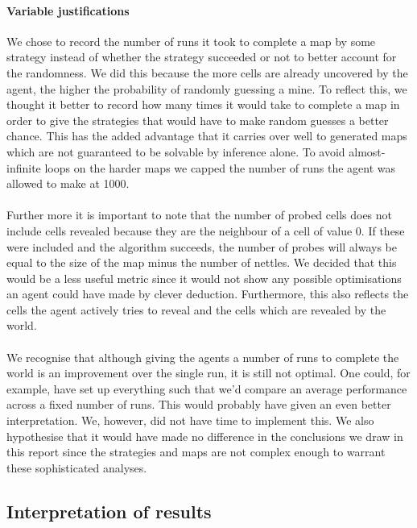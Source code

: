 \documentclass[british]{article}
\begin{document}
\paragraph{Variable justifications}We chose to record the number of runs it took to complete a map by some strategy instead of whether the strategy succeeded or not to better account  for the randomness. We did this because the more cells are already uncovered by the agent, the higher the probability of randomly guessing a mine. To reflect this, we thought it better to record how many times it would take to complete a map in order to give the strategies that would have to make random guesses a better chance. This has the added advantage that it carries over well to generated maps which are not guaranteed to be solvable by inference alone. To avoid almost-infinite loops on the harder maps we capped the number of runs the agent was allowed to make at 1000.
\paragraph{}Further more it is important to note that the number of probed cells does not include cells revealed because they are the neighbour of a cell of value 0. If these were included and the algorithm succeeds, the number of probes will always be equal to the size of the map minus the number of nettles. We decided that this would be a less useful metric since it would not show any possible optimisations an agent could have made by clever deduction. Furthermore, this also reflects the cells the agent actively tries to reveal and the cells which are revealed by the world.
\paragraph{} We recognise that although giving the agents a number of runs to complete the world is an improvement over the single run, it is still not optimal. One could, for example, have set up everything such that we'd compare an average performance across a fixed number of runs. This would probably have given an even better interpretation. We, however, did not have time to implement this. We also hypothesise that it would have made no difference in the conclusions we draw in this report since the strategies and maps are not complex enough to warrant these sophisticated analyses.
\subsection{Interpretation of results}
\label{interpretation}
\end{document}
